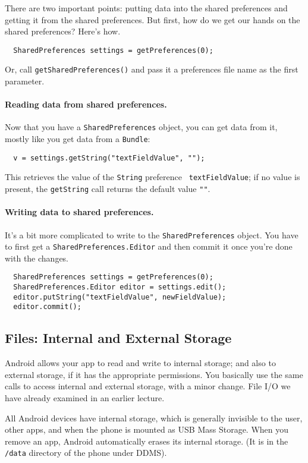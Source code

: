 There are two important points: putting data into the shared preferences
and getting it from the shared preferences. But first, how do we get our
hands on the shared preferences? Here's how.
\begin{verbatim}
  SharedPreferences settings = getPreferences(0);
\end{verbatim}
Or, call {\tt getSharedPreferences()} and pass it a preferences file
name as the first parameter.

\paragraph{Reading data from shared preferences.}
Now that you have a {\tt SharedPreferences} object, you can get data from it, 
mostly like you get data from a {\tt Bundle}:
\begin{verbatim}
  v = settings.getString("textFieldValue", "");
\end{verbatim}
This retrieves the value of the {\tt String} preference {\tt
  textFieldValue}; if no value is present, the {\tt getString} call
returns the default value {\tt ""}.

\paragraph{Writing data to shared preferences.}
It's a bit more complicated to write to the {\tt SharedPreferences}
object.  You have to first get a {\tt SharedPreferences.Editor} and
then commit it once you're done with the changes.

\begin{verbatim}
  SharedPreferences settings = getPreferences(0);
  SharedPreferences.Editor editor = settings.edit();
  editor.putString("textFieldValue", newFieldValue);
  editor.commit();
\end{verbatim}

\subsection*{Files: Internal and External Storage}
Android allows your app to read and write to internal storage; and
also to external storage, if it has the appropriate permissions. You
basically use the same calls to access internal and external storage,
with a minor change. File I/O we have already examined in an earlier lecture.

All Android devices have internal storage, which is generally
invisible to the user, other apps, and when the phone is mounted as
USB Mass Storage. When you remove an app, Android automatically
erases its internal storage. (It is in the {\tt /data} directory of the phone
under DDMS).

